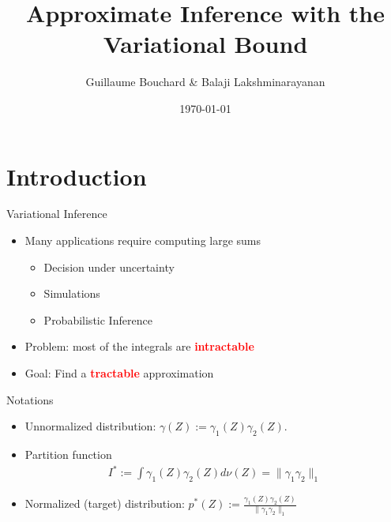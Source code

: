 \documentclass{beamer}
\title[Variational Holder Bound]{Approximate Inference with the \\ Variational \Holder Bound}
\author[Bouchard \& Lakshminarayanan]{Guillaume Bouchard \& Balaji Lakshminarayanan}
\date{\today}
\newcommand{\Expectation}[2]{\int{#2}d\nu(\Z)}
\def\Z{Z}
\renewcommand{\emph}[1]{\textcolor{red}{\textbf{#1}}}
\begin{document}
\frame{\titlepage}

\section{Introduction}
\begin{frame}{Variational Inference}
	\begin{itemize}
	\item Many applications require computing large sums
		\begin{itemize}
		\item Decision under uncertainty
		\item Simulations
		\item Probabilistic Inference
		\end{itemize}
	\item Problem: most of the integrals are \emph{intractable}
	\item Goal: Find a \emph{tractable} approximation
	\end{itemize}
\end{frame}


\begin{frame}{Notations}
\begin{itemize}
	\item Unnormalized distribution: $\gamma(\Z) :=\gamma_1(\Z)\gamma_2(\Z)$.
	\item Partition function
	\begin{eqnarray}
	I^*:=\Expectation{}{\gamma_1(\Z)\gamma_2(\Z)}=\|\gamma_1\gamma_2\|_1
	\end{eqnarray}
	\item Normalized (target) distribution: $p^*(Z) := \frac{\gamma_1(\Z)\gamma_2(\Z)}{\|\gamma_1\gamma_2\|_1}$
\end{itemize}
\end{frame}
\end{document}
